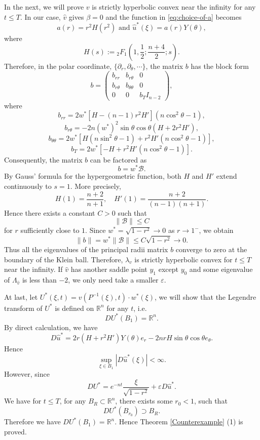 \documentclass[reqno]{amsart}
\theoremstyle{remark}
\theoremstyle{definition}
\numberwithin{equation}{section}
\begin{document}
In the next, we will prove $v$ is strictly hyperbolic convex near the infinity for any $t\leqslant T$. In our case, $\hat{v}$ gives $\beta=0$ and the function in \eqref{eq:choice-of-a} becomes
\[
a(r)=r^2H(r^2) \text{ and } \hat{u}^*(\xi)=a(r)Y(\theta),\]
where
\[
H(s):={}_2F_1\left(1,\frac12;\frac{n+4}{2};s\right). 
\]
Therefore, in the polar coordinate, $\{\partial_r,\partial_\theta,\cdots\}$, the matrix $b$ has the block form
\[
b=
\begin{pmatrix}
b_{rr}&b_{r\theta}&0\\
b_{r\theta}&b_{\theta\theta}&0\\
0&0&b_T I_{n-2}
\end{pmatrix},
\]
where
\[
b_{rr}=2w^*\left[H-(n-1)r^2H'\right](n\cos^2\theta-1),
\]
\[
b_{r\theta}=-2n(w^*)^2\sin\theta\cos\theta\left(H+2r^2H'\right),
\]
\[
b_{\theta\theta}=2w^*\left[H(n\sin^2\theta-1)+r^2H'(n\cos^2\theta-1)\right],
\]
\[
b_T=2w^*\left[-H+r^2H'(n\cos^2\theta-1)\right].
\]
Consequently, the matrix $b$ can be factored as
\[
b=w^*\mathcal B.
\]
By Gauss' formula for the hypergeometric function, both $H$ and $H'$ extend continuously to $s=1$. More precisely,
\[
H(1)=\frac{n+2}{n+1},
\quad
H'(1)=\frac{n+2}{(n-1)(n+1)}.
\]
Hence there exists a constant $C>0$ such that
\[
\|\mathcal B\|\leqslant C
\]
for $r$ sufficiently close to $1$. Since $w^*=\sqrt{1-r^2}\to0$ as $r\to1^-$, we obtain
\[
\|b\|=w^*\|\mathcal B\|\leqslant C\sqrt{1-r^2}\to 0.
\]
Thus all the eigenvalues of the principal radii matrix $b$ converge to zero at the boundary of the Klein ball. 
Therefore, $\lambda_v$ is strictly hyperbolic convex for $t\leqslant T$  near the infinity. If $\hat{v}$ has another saddle point $y_1$ except $y_0$ and some eigenvalue of $\Lambda_{\hat{v}}$ is less than $-2$, we only need  take a smaller $\varepsilon$. 

At last, let \(U^*(\xi, t) = v(P^{-1}(\xi), t)\cdot w^*(\xi)\), we will show that the Legendre transform of $U^*$ is defined on $\mathbb{R}^n$ for any $t$, i.e.
\[
D U^*(B_1) = \mathbb{R}^n.
\]
By direct calculation, we have
\[
D \hat{u}^*=2r\left(H+r^2H'\right)Y(\theta)e_r-2nrH\sin\theta\cos\theta e_\theta.
\]
Hence
\[
\sup_{\xi\in B_1}|D\hat{u}^*(\xi)|<\infty.
\]
However, since
\[
D U^*= e^{-nt}\frac{\xi}{\sqrt{1-r^2}} + \varepsilon D \hat{u}^*.
\]
We have for $t \leqslant T$, for any $B_R \subset \mathbb{R}^n$, there exists some $r_0 < 1$, such that 
\[
D U^*(B_{r_0}) \supset B_R.
\]
Therefore we have $D U^*(B_1) = \mathbb{R}^n$. Hence Theorem \ref{Counterexample} (1) is proved.
\end{document}
